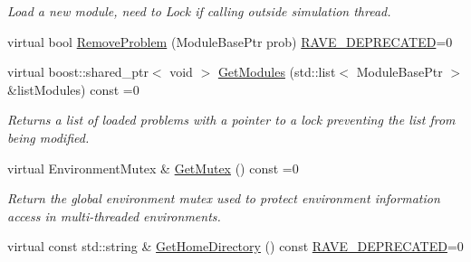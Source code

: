 \begin{DoxyCompactItemize}
\begin{DoxyCompactList}\small\item\em Load a new module, need to Lock if calling outside simulation thread. \item\end{DoxyCompactList}\item 
virtual bool \hyperlink{classOpenRAVE_1_1EnvironmentBase_a3d0482313a9ef3be17b91495f2fa9043}{RemoveProblem} (ModuleBasePtr prob) \hyperlink{classOpenRAVE_1_1EnvironmentBase_acb298cf75a95a9dcfdc2bfccd7321413}{RAVE\_\-DEPRECATED}=0
\item 
virtual boost::shared\_\-ptr$<$ void $>$ \hyperlink{classOpenRAVE_1_1EnvironmentBase_ac571ddc6ccffc3b7cb3bf345f8d29b78}{GetModules} (std::list$<$ ModuleBasePtr $>$ \&listModules) const =0
\begin{DoxyCompactList}\small\item\em Returns a list of loaded problems with a pointer to a lock preventing the list from being modified. \item\end{DoxyCompactList}\item 
virtual EnvironmentMutex \& \hyperlink{classOpenRAVE_1_1EnvironmentBase_a5279da67a9256d95ca7e1140d49af724}{GetMutex} () const =0
\begin{DoxyCompactList}\small\item\em Return the global environment mutex used to protect environment information access in multi-\/threaded environments. \item\end{DoxyCompactList}\item 
virtual const std::string \& \hyperlink{classOpenRAVE_1_1EnvironmentBase_abb0d60e241f34412cb0e002ddbbbdb50}{GetHomeDirectory} () const \hyperlink{classOpenRAVE_1_1EnvironmentBase_acb298cf75a95a9dcfdc2bfccd7321413}{RAVE\_\-DEPRECATED}=0
\end{DoxyCompactItemize}
